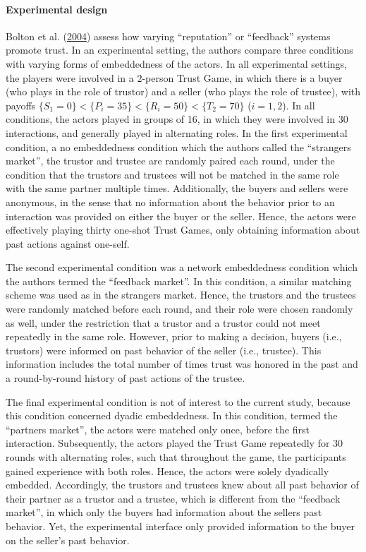\documentclass[
  11pt,
]{article}
\begin{document}
\hypertarget{experimental-design}{%
\paragraph{Experimental design}\label{experimental-design}}

Bolton et al. (\protect\hyperlink{ref-bolton_electronic_2004}{2004}) assess how varying ``reputation'' or ``feedback'' systems promote trust. In an experimental setting, the authors compare three conditions with varying forms of embeddedness of the actors. In all experimental settings, the players were involved in a \(2\)-person Trust Game, in which there is a buyer (who plays in the role of trustor) and a seller (who plays the role of trustee), with payoffs \(\{S_1 = 0\} < \{P_i = 35\} < \{R_i = 50\} < \{T_2 = 70\}\) (\(i = 1,2\)). In all conditions, the actors played in groups of 16, in which they were involved in 30 interactions, and generally played in alternating roles. In the first experimental condition, a no embeddedness condition which the authors called the ``strangers market'', the trustor and trustee are randomly paired each round, under the condition that the trustors and trustees will not be matched in the same role with the same partner multiple times. Additionally, the buyers and sellers were anonymous, in the sense that no information about the behavior prior to an interaction was provided on either the buyer or the seller. Hence, the actors were effectively playing thirty one-shot Trust Games, only obtaining information about past actions against one-self.

The second experimental condition was a network embeddedness condition which the authors termed the ``feedback market''.
In this condition, a similar matching scheme was used as in the strangers market.
Hence, the trustors and the trustees were randomly matched before each round, and their role were chosen randomly as well, under the restriction that a trustor and a trustor could not meet repeatedly in the same role.
However, prior to making a decision, buyers (i.e., trustors) were informed on past behavior of the seller (i.e., trustee).
This information includes the total number of times trust was honored in the past and a round-by-round history of past actions of the trustee.

The final experimental condition is not of interest to the current study, because this condition concerned dyadic embeddedness.
In this condition, termed the ``partners market'', the actors were matched only once, before the first interaction. Subsequently, the actors played the Trust Game repeatedly for 30 rounds with alternating roles, such that throughout the game, the participants gained experience with both roles.
Hence, the actors were solely dyadically embedded.
Accordingly, the trustors and trustees knew about all past behavior of their partner as a trustor and a trustee, which is different from the ``feedback market'', in which only the buyers had information about the sellers past behavior.
Yet, the experimental interface only provided information to the buyer on the seller's past behavior.
\end{document}
